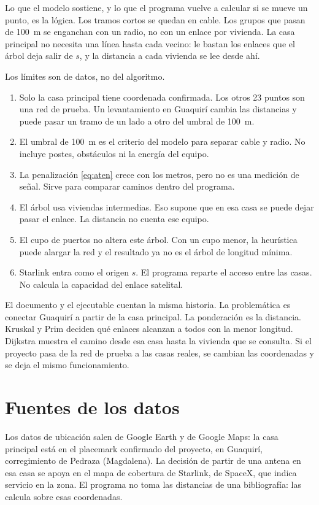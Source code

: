 \documentclass[12pt,a4paper]{article}
\begin{document}
Lo que el modelo sostiene, y lo que el programa vuelve a calcular si se mueve un punto, es la lógica. Los tramos cortos se quedan en cable. Los grupos que pasan de 100~m se enganchan con un radio, no con un enlace por vivienda. La casa principal no necesita una línea hasta cada vecino: le bastan los enlaces que el árbol deja salir de \(s\), y la distancia a cada vivienda se lee desde ahí.

Los límites son de datos, no del algoritmo.

\begin{enumerate}
  \item Solo la casa principal tiene coordenada confirmada. Los otros 23 puntos son una red de prueba. Un levantamiento en Guaquirí cambia las distancias y puede pasar un tramo de un lado a otro del umbral de 100~m.
  \item El umbral de 100~m es el criterio del modelo para separar cable y radio. No incluye postes, obstáculos ni la energía del equipo.
  \item La penalización \eqref{eq:aten} crece con los metros, pero no es una medición de señal. Sirve para comparar caminos dentro del programa.
  \item El árbol usa viviendas intermedias. Eso supone que en esa casa se puede dejar pasar el enlace. La distancia no cuenta ese equipo.
  \item El cupo de puertos no altera este árbol. Con un cupo menor, la heurística puede alargar la red y el resultado ya no es el árbol de longitud mínima.
  \item Starlink entra como el origen \(s\). El programa reparte el acceso entre las casas. No calcula la capacidad del enlace satelital.
\end{enumerate}

El documento y el ejecutable cuentan la misma historia. La problemática es conectar Guaquirí a partir de la casa principal. La ponderación es la distancia. Kruskal y Prim deciden qué enlaces alcanzan a todos con la menor longitud. Dijkstra muestra el camino desde esa casa hasta la vivienda que se consulta. Si el proyecto pasa de la red de prueba a las casas reales, se cambian las coordenadas y se deja el mismo funcionamiento.

\section*{Fuentes de los datos}

Los datos de ubicación salen de Google Earth y de Google Maps: la casa principal está en el placemark confirmado del proyecto, en Guaquirí, corregimiento de Pedraza (Magdalena). La decisión de partir de una antena en esa casa se apoya en el mapa de cobertura de Starlink, de SpaceX, que indica servicio en la zona. El programa no toma las distancias de una bibliografía: las calcula sobre esas coordenadas.
\end{document}
